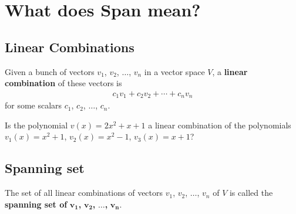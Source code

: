 \documentclass[12pt,a4paper]{article}
\newcounter{example}[section]
\begin{document}
	
	
	\newpage
	
\section{What does Span mean?}

	\subsection{Linear Combinations}
	
	Given a bunch of vectors $v_1$, $v_2$, $\ldots$, $v_n$ in a vector space $V$, a \textbf{linear combination} of these vectors is
		\begin{align*}
		c_1 v_1 + c_2 v_2 + \cdots + c_n v_n
		\end{align*}
	for some scalars $c_1$, $c_2$, $\ldots$, $c_n$.
	
	\vspace*{18pt}
	
	\begin{example}
	Is the polynomial $v(x) = 2x^2 + x + 1$ a linear combination of the polynomials $v_1 (x) = x^2 + 1$, $v_2 (x) = x^2 - 1$, $v_3 (x) = x + 1$?
	\end{example}
	
	\newpage
	
	\subsection{Spanning set}
	
	The set of all linear combinations of vectors $v_1$, $v_2$, $\ldots$, $v_n$ of $V$ is called the \textbf{spanning set of} $\mathbf{v_1}$\textbf{,} $\mathbf{v_2}$\textbf{,} $\mathbf{\ldots}$\textbf{,} $\mathbf{v_n}$.
	
\end{document}
